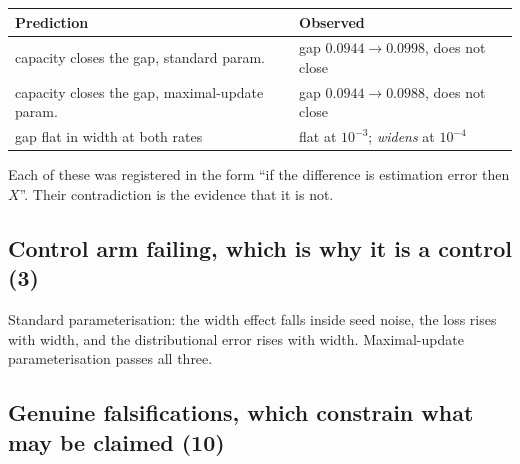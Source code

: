 \documentclass[11pt]{article}
\begin{document}
\begin{center}
\begin{tabular}{@{}ll@{}}
\toprule
Prediction & Observed\\
\midrule
capacity closes the gap, standard param. & gap $0.0944\to0.0998$, does not close\\
capacity closes the gap, maximal-update param. & gap $0.0944\to0.0988$, does not close\\
gap flat in width at both rates & flat at $10^{-3}$; \emph{widens} at $10^{-4}$\\
\bottomrule
\end{tabular}
\end{center}

Each of these was registered in the form ``if the difference is estimation error then $X$''. Their
contradiction is the evidence that it is not.

\subsection*{Control arm failing, which is why it is a control (3)}

Standard parameterisation: the width effect falls inside seed noise, the loss rises with width,
and the distributional error rises with width. Maximal-update parameterisation passes all three.

\subsection*{Genuine falsifications, which constrain what may be claimed (10)}
\end{document}
